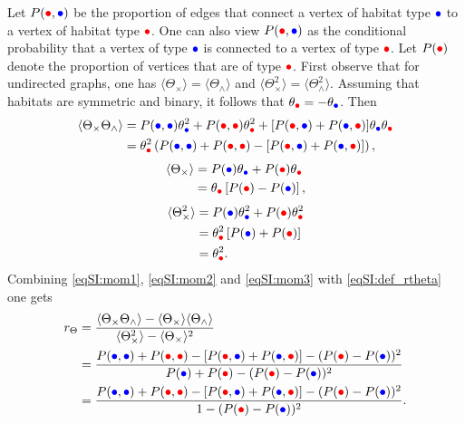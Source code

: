 Let $P(\rcirc,\bcirc)$ be the proportion of edges that connect a vertex of habitat type $\bcirc$ to a vertex of habitat type $\rcirc$. One can also view $P(\rcirc,\bcirc)$ as the conditional probability that a vertex of type $\bcirc$ is connected to a vertex of type $\rcirc$. Let $P(\rcirc)$ denote the proportion of vertices that are of type $\rcirc$. 
%
First observe that for undirected graphs, one has $ \langle \Theta_\times \rangle  = \langle \Theta_\wedge \rangle$ and $ \langle \Theta_\times^2 \rangle  = \langle \Theta_\wedge^2 \rangle$.
%
Assuming that habitats are symmetric and binary, it follows that $\theta_{\rcirc} = -\theta_{\bcirc}$. Then
\begin{equation}\label{eqSI:mom1}
  \begin{split}
    \langle \Theta_\times\Theta_\wedge \rangle &=P(\bcirc,\bcirc)\theta_{\bcirc}^2 + P(\rcirc,\rcirc)\theta_{\rcirc}^2 + [ P(\rcirc,\bcirc) + P(\bcirc,\rcirc)]\theta_{\bcirc}\theta_{\rcirc}  \\
    &= \theta_{\rcirc}^2 \left( P(\bcirc,\bcirc) + P(\rcirc,\rcirc) -  [ P(\rcirc,\bcirc) + P(\bcirc,\rcirc)] \right) ,
  \end{split}
\end{equation}
\begin{equation}\label{eqSI:mom2}
  \begin{split}
    \langle \Theta_\times \rangle &=  P(\bcirc)\theta_{\bcirc} + P(\rcirc)\theta_{\rcirc}\\
    &= \theta_{\rcirc} \left[ P(\rcirc) - P(\bcirc)\right],
  \end{split}
\end{equation}
\begin{equation}\label{eqSI:mom3}
  \begin{split}
    \langle \Theta_\times^2 \rangle &=  P(\bcirc)\theta_{\bcirc}^2 + P(\rcirc)\theta_{\rcirc}^2\\
    &= \theta_{\rcirc}^2 \left[ P(\bcirc) + P(\rcirc) \right] \\
    &= \theta_{\rcirc}^2 .
  \end{split}
\end{equation}
Combining \cref{eqSI:mom1}, \cref{eqSI:mom2} and \cref{eqSI:mom3} with \cref{eqSI:def_rtheta} one gets
\begin{equation}
  \begin{split}
    r_\Theta
    &= \frac{\langle  \Theta_\times \Theta_\wedge \rangle - \langle  \Theta_\times \rangle \langle  \Theta_\wedge \rangle }{  \langle \Theta_\times^2 \rangle - \langle \Theta_\times \rangle^2}\\
    &= \frac{ P(\bcirc,\bcirc) + P(\rcirc,\rcirc) -  [ P(\rcirc,\bcirc) + P(\bcirc,\rcirc)] - (P(\rcirc) - P(\bcirc))^2}{P(\bcirc) + P(\rcirc) - (P(\rcirc) - P(\bcirc))^2} \\
    &= \frac{ P(\bcirc,\bcirc) + P(\rcirc,\rcirc)  - [ P(\rcirc,\bcirc) + P(\bcirc,\rcirc)] - (P(\rcirc) - P(\bcirc))^2}{1- (P(\rcirc) - P(\bcirc))^2}.
  \end{split}
\end{equation}

